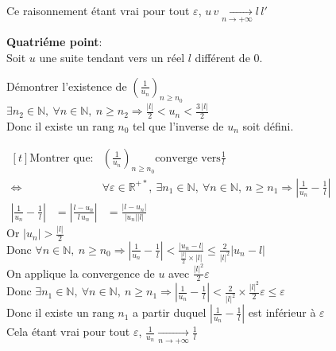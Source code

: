 \documentclass[12pt,twoside,a4paper]{article}
\begin{document}
\begin{preuve}
\begin{liste}
					Ce raisonnement \'etant vrai pour tout $\varepsilon$, $u\,v\mathop{\longrightarrow}\limits_{n\rightarrow+\infty}l\,l'$
				\item\textbf{Quatri\'eme point}:\\
					Soit $u$ une suite tendant vers un r\'eel $l$ diff\'erent de 0.\\
					\begin{liste}
						\item D\'emontrer l'existence de $\left(\frac{1}{u_n}\right)_{n\geqslant n_0}$\\
							$\exists n_2\in\mathbb{N},\ \forall n\in\mathbb{N},\ n\geqslant n_2\Rightarrow \frac{|l|}{2}<u_n<\frac{3\,|l|}{2}$\\
							Donc il existe un rang $n_0$ tel que l'inverse de $u_n$ soit d\'efini.
						\item $\begin{aligned}[t]\text{Montrer que:}&\left(\frac{1}{u_n}\right)_{n\geqslant n_0}\text{converge vers}\frac{1}{l}\\
								\iff&\forall\varepsilon\in\mathbb{R}^{+*},\ \exists n_1\in\mathbb{N},\ \forall n\in\mathbb{N},\ n\geqslant n_1\Rightarrow\left|\frac{1}{u_n}-\frac{1}{l}\right|\end{aligned}$
							$\begin{aligned}\left|\frac{1}{u_n}-\frac{1}{l}\right|&=\left|\frac{l-u_n}{l\,u_n}\right|
								&=\frac{\left| l-u_n\right|}{\left| u_n\right| \left| l\right| }\end{aligned}$\\
							Or $\left| u_n\right| >\frac{\left| l\right| }{2}$\\
							Donc $\forall n\in\mathbb{N},\ n\geqslant n_0\Rightarrow\left|\frac{1}{u_n}-\frac{1}{l}\right|<\frac{\left| u_n-l\right| }{\frac{\left| l\right| }{2}\times\left| l\right| }\leqslant \frac{2}{\left| l\right| ^2}\left| u_n-l\right|$\\
							On applique la convergence de $u$ avec $\frac{\left| l\right| ^2}{2}\varepsilon$\\
							Donc $\exists n_1\in\mathbb{N},\ \forall n\in\mathbb{N},\ n\geqslant n_1\Rightarrow\left|\frac{1}{u_n}-\frac{1}{l}\right|< \frac{2}{\left| l\right| ^2}\times\frac{\left| l\right| ^2}{2}\varepsilon \leqslant \varepsilon$\\
							Donc il existe un rang $n_1$ a partir duquel $\left|\frac{1}{u_n}-\frac{1}{l}\right|$ est inf\'erieur \`a $\varepsilon$\\
							Cela \'etant vrai pour tout $\varepsilon$, $\frac{1}{u_n}\mathop{\longrightarrow}\limits_{n\rightarrow+\infty}\frac{1}{l}$
					\end{liste}
			\end{liste}
		\end{preuve}
\end{document}
